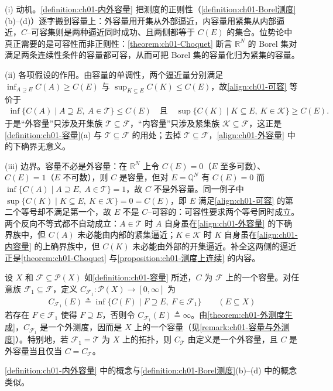 \documentclass[../../main.tex]{subfiles}%
\begin{document}
\begin{remark}\label{remark:ch01-内外容量动机}
(i) 动机。\cref{definition:ch01-内外容量} 把测度的正则性（\cref{definition:ch01-Borel测度}(b)--(d)）逐字搬到容量上：外容量用开集从外部逼近，内容量用紧集从内部逼近，$C$--可容集则是两种逼近同时成功、且两侧都等于 $C(E)$ 的集合。位势论中真正需要的是可容性而非正则性：\cref{theorem:ch01-Choquet} 断言 $\mathbb{R}^N$ 的 Borel 集对满足两条连续性条件的容量都可容，从而可把 Borel 集的容量化归为紧集的容量。

(ii) 各项假设的作用。由容量的单调性，两个逼近量分别满足 $\inf_{A\supseteq E}C(A)\geqslant C(E)$ 与 $\sup_{K\subseteq E}C(K)\leqslant C(E)$，故\eqref{align:ch01-可容} 等价于
\begin{align*}
\inf\{C(A)\mid A\supseteq E,\ A\in\mathcal{T}\}\leqslant C(E)\quad\text{且}\quad\sup\{C(K)\mid K\subseteq E,\ K\in\mathcal{K}\}\geqslant C(E).
\end{align*}
于是“外容量”只涉及开集族 $\mathcal{T}\subseteq\mathcal{F}$，“内容量”只涉及紧集族 $\mathcal{K}\subseteq\mathcal{F}$，这正是\cref{definition:ch01-容量}(a) 与 $\mathcal{T}\subseteq\mathcal{F}$ 的用处；去掉 $\mathcal{T}\subseteq\mathcal{F}$，\eqref{align:ch01-外容量} 中的下确界无意义。

(iii) 边界。容量不必是外容量：在 $\mathbb{R}^N$ 上令 $C(E)=0$（$E$ 至多可数）、$C(E)=1$（$E$ 不可数），则 $C$ 是容量，但对 $E=\mathbb{Q}^N$ 有 $C(E)=0$ 而 $\inf\{C(A)\mid A\supseteq E,\ A\in\mathcal{T}\}=1$，故 $C$ 不是外容量。同一例子中 $\sup\{C(K)\mid K\subseteq E,\ K\in\mathcal{K}\}=0=C(E)$，即 $E$ 满足\eqref{align:ch01-可容} 的第二个等号却不满足第一个，故 $E$ 不是 $C$--可容的：可容性要求两个等号同时成立。两个反向不等式都不自动成立：$A\in\mathcal{T}$ 时 $A$ 自身虽在\eqref{align:ch01-外容量} 的下确界族中，但 $C(A)$ 未必能由内部的紧集逼近；$K\in\mathcal{K}$ 时 $K$ 自身虽在\eqref{align:ch01-内容量} 的上确界族中，但 $C(K)$ 未必能由外部的开集逼近。补全这两侧的逼近正是\cref{theorem:ch01-Choquet} 与\cref{proposition:ch01-测度上连续} 的内容。
\end{remark}

\begin{remark}\label{remark:ch01-容量生成}
设 $X$ 和 $\mathcal{F}\subseteq\mathcal{P}(X)$ 如\cref{definition:ch01-容量} 所述，$C$ 为 $\mathcal{F}$ 上的一个容量。对任意族 $\mathcal{F}_1\subseteq\mathcal{F}$，定义 $C_{\mathcal{F}_1}:\mathcal{P}(X)\to[0,\infty]$ 为
\begin{align*}
C_{\mathcal{F}_1}(E)\triangleq\inf\{C(F)\mid F\supseteq E,\ F\in\mathcal{F}_1\}\qquad(E\subseteq X)
\end{align*}
若存在 $F\in\mathcal{F}_1$ 使得 $F\supseteq E$，否则令 $C_{\mathcal{F}_1}(E)\triangleq\infty$。由\cref{theorem:ch01-外测度生成}，$C_{\mathcal{F}_1}$ 是一个外测度，因而是 $X$ 上的一个容量（见\cref{remark:ch01-容量与外测度}）。特别地，若 $\mathcal{F}_1=\mathcal{T}$ 为 $X$ 上的拓扑，则 $C_{\mathcal{T}}$ 由定义是一个外容量，且 $C$ 是外容量当且仅当 $C=C_{\mathcal{T}}$。

\cref{definition:ch01-内外容量} 中的概念与\cref{definition:ch01-Borel测度}(b)--(d) 中的概念类似。
\end{remark}
\end{document}

